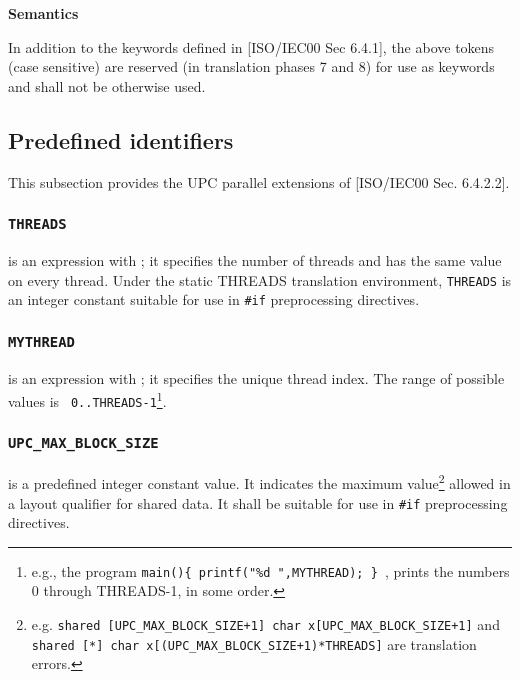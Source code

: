 {\bf Semantics}

\np In addition to the keywords defined in [ISO/IEC00 Sec 6.4.1], the above
tokens (case sensitive) are reserved (in translation phases 7 and 8) for use
as keywords and shall not be otherwise used.

 
\subsection{Predefined identifiers}

\npf This subsection provides the UPC parallel extensions of
    [ISO/IEC00 Sec. 6.4.2.2].

\subsubsection{{\tt THREADS}}
\label{threads}
 is an expression with %
     ; %
     it specifies the number of
     threads and has the same value on every
     thread.   Under the static THREADS translation environment, {\tt THREADS}
     is an integer constant suitable for use in {\tt \#if} preprocessing directives.

\subsubsection{{\tt MYTHREAD}}
 is an expression with %
     ; %
     it specifies the
     unique thread index.%
     The range of possible values is {\tt
     0..THREADS-1}\footnote{e.g., the program {\tt main()\{
     printf("\%d ",MYTHREAD); \} }, prints the numbers 0 through
     THREADS-1, in some order.}.

\subsubsection{{\tt UPC\_MAX\_BLOCK\_SIZE}}
\label{max_block_size}
 is a predefined integer
     constant value.  It indicates the maximum value\footnote{
     e.g. {\tt shared [UPC\_MAX\_BLOCK\_SIZE+1] char
     x[UPC\_MAX\_BLOCK\_SIZE+1]} and {\tt shared [*] char
     x[(UPC\_MAX\_BLOCK\_SIZE+1)*THREADS]} are translation errors.} allowed
     in a layout qualifier for shared data.  It shall be suitable for use in 
     {\tt \#if} preprocessing directives.

